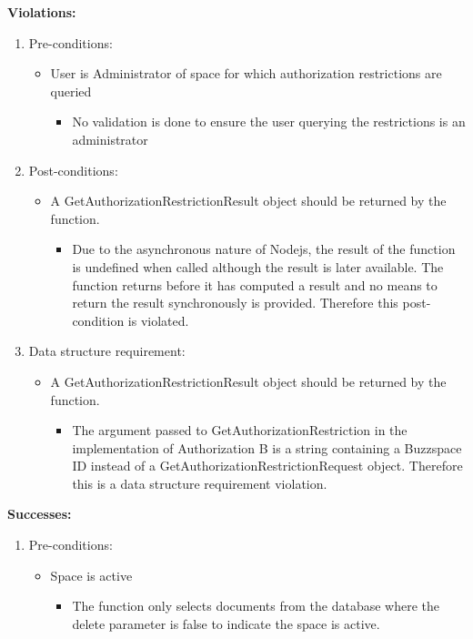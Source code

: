 \textbf{Violations:}
\begin{enumerate}
	\item Pre-conditions:	
	\begin{itemize}
		\item User is Administrator of space for which authorization restrictions are queried
		\begin{itemize}
				\item No validation is done to ensure the user querying the restrictions is an administrator
		\end{itemize}
	\end{itemize}
	
	\item Post-conditions:
	\begin{itemize}
		\item  A GetAuthorizationRestrictionResult object should be returned by the function. 
		\begin{itemize}
				\item Due to the asynchronous nature of Nodejs, the result of the function is undefined when called although the result is later available. The function returns before it has computed a result and no means to return the result synchronously is provided. Therefore this post-condition is violated.
		\end{itemize}
	\end{itemize}
	
	\item Data structure requirement:
	\begin{itemize}
		\item  A GetAuthorizationRestrictionResult object should be returned by the function. 
		\begin{itemize}
				\item The argument passed to GetAuthorizationRestriction in the implementation of Authorization B is a string containing a Buzzspace ID instead of a GetAuthorizationRestrictionRequest object. Therefore this is a data structure requirement violation.
		\end{itemize}
	\end{itemize}
		
\end{enumerate}

\textbf{Successes:}
\begin{enumerate}
	\item Pre-conditions:	
	\begin{itemize}
		\item Space is active
		\begin{itemize}
				\item The function only selects documents from the database where the delete parameter is false to indicate the space is active.
		\end{itemize}
	\end{itemize}	
\end{enumerate}


\noindent
\medskip




